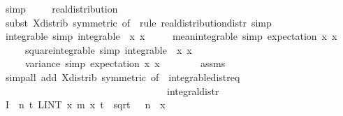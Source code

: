 {\ simp\isanewline
\ \ \isamarkupfalse%
\ {\isasymmu}{\isacharcolon}\ real{\isacharunderscore}distribution\ {\isasymmu}\isanewline
\ \ \ \ \isamarkupfalse%
\ {\isacharparenleft}subst\ X{\isacharunderscore}distrib\ {\isacharbrackleft}symmetric{\isacharcomma}\ of\ {}{\isacharbrackright}{\isacharcomma}\ rule\ real{\isacharunderscore}distribution{\isacharunderscore}distr{\isacharcomma}\ simp{\isacharparenright}\isanewline
\isanewline
\ \ \isanewline
\ \ \isamarkupfalse%
\ {\isasymmu}{\isacharunderscore}integrable\ {\isacharbrackleft}simp{\isacharbrackright}{\isacharcolon}\ {\isachardoublequoteopen}integrable\ {\isasymmu}\ {\isacharparenleft}{\isasymlambda}x{\isachardot}\ x{\isacharparenright}{\isachardoublequoteclose}\isanewline
\ \ \ \ \ {\isasymmu}{\isacharunderscore}mean{\isacharunderscore}integrable\ {\isacharbrackleft}simp{\isacharbrackright}{\isacharcolon}\ {\isachardoublequoteopen}{\isasymmu}{\isachardot}expectation\ {\isacharparenleft}{\isasymlambda}x{\isachardot}\ x{\isacharparenright}\ {\isacharequal}\ {}{\isachardoublequoteclose}\isanewline
\ \ \ \ \ {\isasymmu}{\isacharunderscore}square{\isacharunderscore}integrable\ {\isacharbrackleft}simp{\isacharbrackright}{\isacharcolon}\ {\isachardoublequoteopen}integrable\ {\isasymmu}\ {\isacharparenleft}{\isasymlambda}x{\isachardot}\ x{\isacharcircum}{}{\isacharparenright}{\isachardoublequoteclose}\isanewline
\ \ \ \ \ {\isasymmu}{\isacharunderscore}variance\ {\isacharbrackleft}simp{\isacharbrackright}{\isacharcolon}\ {\isachardoublequoteopen}{\isasymmu}{\isachardot}expectation\ {\isacharparenleft}{\isasymlambda}x{\isachardot}\ x{\isacharcircum}{}{\isacharparenright}\ {\isacharequal}\ {\isasymsigma}\isanewline
\ \ \ \ \isamarkupfalse%
\ assms\ \isamarkupfalse%
\ {\isacharparenleft}simp{\isacharunderscore}all\ add{\isacharcolon}\ X{\isacharunderscore}distrib\ {\isacharbrackleft}symmetric{\isacharcomma}\ of\ {}{\isacharbrackright}\ integrable{\isacharunderscore}distr{\isacharunderscore}eq\isanewline
\ \ \ \ \ \ \ \ \ \ \ \ \ \ \ \ \ \ \ \ \ \ \ \ \ \ \ \ \ \ \ \ \ \ integral{\isacharunderscore}distr{\isacharparenright}\isanewline
\isanewline
\ \ \isamarkupfalse%
\ {\isacharquery}I\ {\isacharequal}\ {\isachardoublequoteopen}{\isasymlambda}n\ t{\isachardot}\ LINT\ x{\isacharbar}{\isasymmu}{\isachardot}\ {\isacharquery}m\ x\ {\isacharparenleft}{\isasymbar}t\ {\isacharslash}\ sqrt\ {\isacharparenleft}{\isasymsigma}\ {\isacharasterisk}\ n{\isacharparenright}{\isasymbar}\ {\isacharasterisk}\ {\isasymbar}x{\isasymbar}\ {\isacharcircum}\ {}{\isacharparenright}{\isachardoublequoteclose}\isanewline
}
